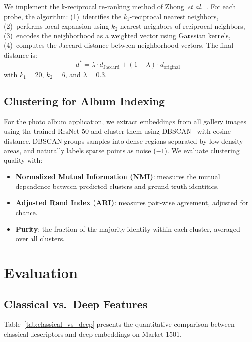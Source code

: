 \documentclass[final]{cvpr}
\begin{document}
We implement the k-reciprocal re-ranking method of Zhong~\emph{et al.}~\cite{zhong2017reranking}.
For each probe, the algorithm:
(1)~identifies the $k_1$-reciprocal nearest neighbors,
(2)~performs local expansion using $k_2$-nearest neighbors of reciprocal neighbors,
(3)~encodes the neighborhood as a weighted vector using Gaussian kernels,
(4)~computes the Jaccard distance between neighborhood vectors.
The final distance is:
\begin{equation}
    d^* = \lambda \cdot d_{\text{Jaccard}} + (1 - \lambda) \cdot d_{\text{original}}
\end{equation}
with $k_1 = 20$, $k_2 = 6$, and $\lambda = 0.3$.

\subsection{Clustering for Album Indexing}

For the photo album application, we extract embeddings from all gallery images using the trained ResNet-50 and cluster them using DBSCAN~\cite{ester1996dbscan} with cosine distance.
DBSCAN groups samples into dense regions separated by low-density areas, and naturally labels sparse points as noise ($-1$).
We evaluate clustering quality with:
\begin{itemize}
    \item \textbf{Normalized Mutual Information (NMI)}: measures the mutual dependence between predicted clusters and ground-truth identities.
    \item \textbf{Adjusted Rand Index (ARI)}: measures pair-wise agreement, adjusted for chance.
    \item \textbf{Purity}: the fraction of the majority identity within each cluster, averaged over all clusters.
\end{itemize}

\section{Evaluation}

\subsection{Classical vs.\ Deep Features}

Table~\ref{tab:classical_vs_deep} presents the quantitative comparison between classical descriptors and deep embeddings on Market-1501.
\end{document}
